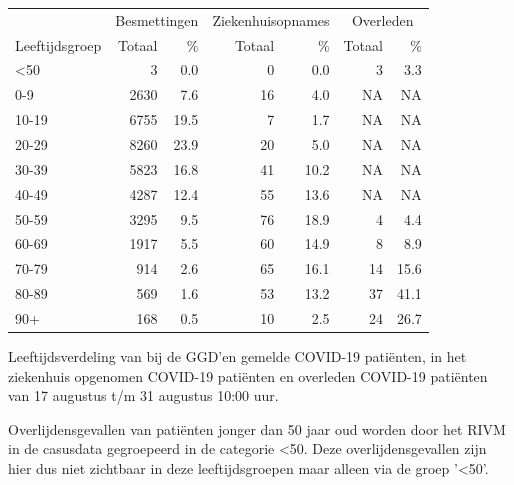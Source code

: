 \documentclass[
  english,
  man,floatsintext]{apa6}
\begin{document}
\begin{table}
\centering\begingroup\fontsize{11}{13}\selectfont

\begin{threeparttable}
\begin{tabular}{lrrrrrr}
\toprule
\multicolumn{1}{c}{ } & \multicolumn{2}{c}{Besmettingen} & \multicolumn{2}{c}{Ziekenhuisopnames} & \multicolumn{2}{c}{Overleden} \\
\cmidrule(l{3pt}r{3pt}){2-3} \cmidrule(l{3pt}r{3pt}){4-5} \cmidrule(l{3pt}r{3pt}){6-7}
Leeftijdsgroep & Totaal & \% & Totaal & \% & Totaal & \%\\
\midrule
<50 & 3 & 0.0 & 0 & 0.0 & 3 & 3.3\\
0-9 & 2630 & 7.6 & 16 & 4.0 & NA & NA\\
10-19 & 6755 & 19.5 & 7 & 1.7 & NA & NA\\
20-29 & 8260 & 23.9 & 20 & 5.0 & NA & NA\\
30-39 & 5823 & 16.8 & 41 & 10.2 & NA & NA\\
40-49 & 4287 & 12.4 & 55 & 13.6 & NA & NA\\
50-59 & 3295 & 9.5 & 76 & 18.9 & 4 & 4.4\\
60-69 & 1917 & 5.5 & 60 & 14.9 & 8 & 8.9\\
70-79 & 914 & 2.6 & 65 & 16.1 & 14 & 15.6\\
80-89 & 569 & 1.6 & 53 & 13.2 & 37 & 41.1\\
90+ & 168 & 0.5 & 10 & 2.5 & 24 & 26.7\\
\bottomrule
\end{tabular}
\begin{tablenotes}
\item[1] Leeftijdsverdeling van bij de GGD’en gemelde COVID-19 patiënten, in het ziekenhuis opgenomen COVID-19 patiënten en overleden COVID-19 patiënten van 17 augustus t/m 31 augustus 10:00 uur.
\item[2] Overlijdensgevallen van patiënten jonger dan 50 jaar oud worden door het RIVM in de casusdata gegroepeerd in de categorie <50. Deze overlijdensgevallen zijn hier dus niet zichtbaar in deze leeftijdsgroepen maar alleen via de groep '<50'.
\end{tablenotes}
\end{threeparttable}
\endgroup{}
\end{table}

\newpage
\end{document}
